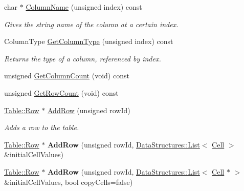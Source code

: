 \begin{DoxyCompactItemize}
\item 
char $\ast$ \hyperlink{class_data_structures_1_1_table_a2897ef154b3fe20874cd9d5b92abafac}{Column\-Name} (unsigned index) const 
\begin{DoxyCompactList}\small\item\em Gives the string name of the column at a certain index. \end{DoxyCompactList}\item 
Column\-Type \hyperlink{class_data_structures_1_1_table_a47127c91ec827f714793a7adfd73f3e8}{Get\-Column\-Type} (unsigned index) const 
\begin{DoxyCompactList}\small\item\em Returns the type of a column, referenced by index. \end{DoxyCompactList}\item 
unsigned \hyperlink{class_data_structures_1_1_table_a27d8e485daec7a9e9800de08f86828d1}{Get\-Column\-Count} (void) const 
\item 
unsigned \hyperlink{class_data_structures_1_1_table_a17ca98f3efdcab9be32839dc4b31a908}{Get\-Row\-Count} (void) const 
\item 
\hyperlink{struct_data_structures_1_1_table_1_1_row}{Table\-::\-Row} $\ast$ \hyperlink{class_data_structures_1_1_table_af8b0a6069841f2d12b7f5df7c073adc7}{Add\-Row} (unsigned row\-Id)
\begin{DoxyCompactList}\small\item\em Adds a row to the table. \end{DoxyCompactList}\item 
\hypertarget{class_data_structures_1_1_table_afde6d6115e83e8903b9410d4a9de03a6}{\hyperlink{struct_data_structures_1_1_table_1_1_row}{Table\-::\-Row} $\ast$ {\bfseries Add\-Row} (unsigned row\-Id, \hyperlink{class_data_structures_1_1_list}{Data\-Structures\-::\-List}$<$ \hyperlink{struct_data_structures_1_1_table_1_1_cell}{Cell} $>$ \&initial\-Cell\-Values)}\label{class_data_structures_1_1_table_afde6d6115e83e8903b9410d4a9de03a6}

\item 
\hypertarget{class_data_structures_1_1_table_a4d008f6a13ee9a488bd0693214511f9f}{\hyperlink{struct_data_structures_1_1_table_1_1_row}{Table\-::\-Row} $\ast$ {\bfseries Add\-Row} (unsigned row\-Id, \hyperlink{class_data_structures_1_1_list}{Data\-Structures\-::\-List}$<$ \hyperlink{struct_data_structures_1_1_table_1_1_cell}{Cell} $\ast$ $>$ \&initial\-Cell\-Values, bool copy\-Cells=false)}\label{class_data_structures_1_1_table_a4d008f6a13ee9a488bd0693214511f9f}


\end{DoxyCompactItemize}
